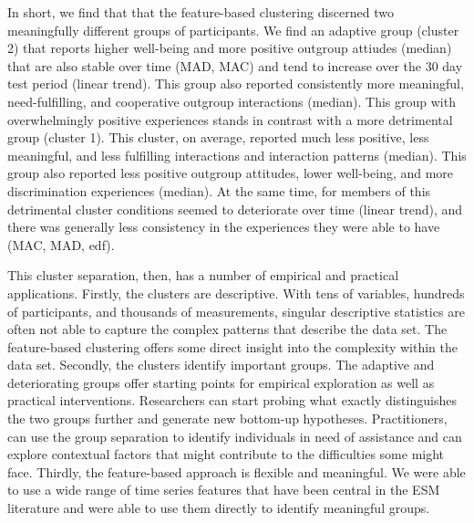 In short, we find that that the feature-based clustering discerned two
meaningfully different groups of participants. We find an adaptive group
(cluster 2) that reports higher well-being and more positive outgroup
attiudes (median) that are also stable over time (MAD, MAC) and tend to
increase over the 30 day test period (linear trend). This group also
reported consistently more meaningful, need-fulfilling, and cooperative
outgroup interactions (median). This group with overwhelmingly positive
experiences stands in contrast with a more detrimental group (cluster
1). This cluster, on average, reported much less positive, less
meaningful, and less fulfilling interactions and interaction patterns
(median). This group also reported less positive outgroup attitudes,
lower well-being, and more discrimination experiences (median). At the
same time, for members of this detrimental cluster conditions seemed to
deteriorate over time (linear trend), and there was generally less
consistency in the experiences they were able to have (MAC, MAD, edf).

This cluster separation, then, has a number of empirical and practical
applications. Firstly, the clusters are descriptive. With tens of
variables, hundreds of participants, and thousands of measurements,
singular descriptive statistics are often not able to capture the
complex patterns that describe the data set. The feature-based
clustering offers some direct insight into the complexity within the
data set. Secondly, the clusters identify important groups. The adaptive
and deteriorating groups offer starting points for empirical exploration
as well as practical interventions. Researchers can start probing what
exactly distinguishes the two groups further and generate new bottom-up
hypotheses. Practitioners, can use the group separation to identify
individuals in need of assistance and can explore contextual factors
that might contribute to the difficulties some might face. Thirdly, the
feature-based approach is flexible and meaningful. We were able to use a
wide range of time series features that have been central in the ESM
literature and were able to use them directly to identify meaningful
groups.

